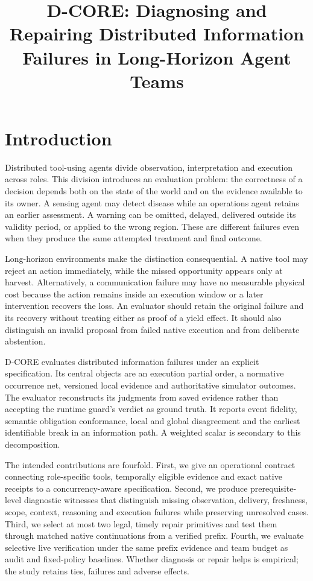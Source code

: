 \documentclass[sigconf,anonymous]{aamas}
\title{D-CORE: Diagnosing and Repairing Distributed Information Failures in Long-Horizon Agent Teams}
\begin{document}
\maketitle

\section{Introduction}
Distributed tool-using agents divide observation, interpretation and execution across roles. This division introduces an evaluation problem: the correctness of a decision depends both on the state of the world and on the evidence available to its owner. A sensing agent may detect disease while an operations agent retains an earlier assessment. A warning can be omitted, delayed, delivered outside its validity period, or applied to the wrong region. These are different failures even when they produce the same attempted treatment and final outcome.

Long-horizon environments make the distinction consequential. A native tool may reject an action immediately, while the missed opportunity appears only at harvest. Alternatively, a communication failure may have no measurable physical cost because the action remains inside an execution window or a later intervention recovers the loss. An evaluator should retain the original failure and its recovery without treating either as proof of a yield effect. It should also distinguish an invalid proposal from failed native execution and from deliberate abstention.

D-CORE evaluates distributed information failures under an explicit specification. Its central objects are an execution partial order, a normative occurrence net, versioned local evidence and authoritative simulator outcomes. The evaluator reconstructs its judgments from saved evidence rather than accepting the runtime guard's verdict as ground truth. It reports event fidelity, semantic obligation conformance, local and global disagreement and the earliest identifiable break in an information path. A weighted scalar is secondary to this decomposition.

The intended contributions are fourfold. First, we give an operational contract connecting role-specific tools, temporally eligible evidence and exact native receipts to a concurrency-aware specification. Second, we produce prerequisite-level diagnostic witnesses that distinguish missing observation, delivery, freshness, scope, context, reasoning and execution failures while preserving unresolved cases. Third, we select at most two legal, timely repair primitives and test them through matched native continuations from a verified prefix. Fourth, we evaluate selective live verification under the same prefix evidence and team budget as audit and fixed-policy baselines. Whether diagnosis or repair helps is empirical; the study retains ties, failures and adverse effects.
\end{document}
